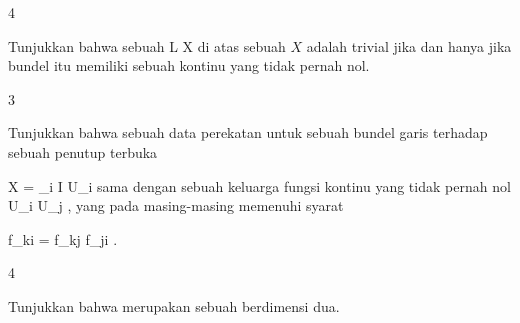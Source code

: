 {4}
{

Tunjukkan bahwa sebuah
\maabb {} { L } { X
} {}
di atas sebuah
$X$ adalah trivial jika dan hanya jika bundel itu memiliki sebuah
kontinu yang tidak pernah nol.

}
{} {}

{3}
{

Tunjukkan bahwa sebuah data perekatan untuk sebuah bundel garis terhadap sebuah penutup terbuka

\mavergleichskette
{\vergleichskette
{X
}
{ = }{ \bigcup_{i \in I} U_i
}
{  }{
}
{    }{
}
{   }{
}
}
{}{}{}
sama dengan sebuah keluarga fungsi kontinu yang tidak pernah nol
 {U_i \cap U_j } { \R
} {,}
yang pada
 masing-masing memenuhi syarat

\mavergleichskette
{\vergleichskette
{ f_{ki}
}
{ = }{ f_{kj} \cdot f_{ji}
}
{  }{
}
{    }{
}
{   }{
}
}
{}{}{.}

}
{} {}

{4}
{

Tunjukkan bahwa
merupakan sebuah
berdimensi dua.

}
{} {}
